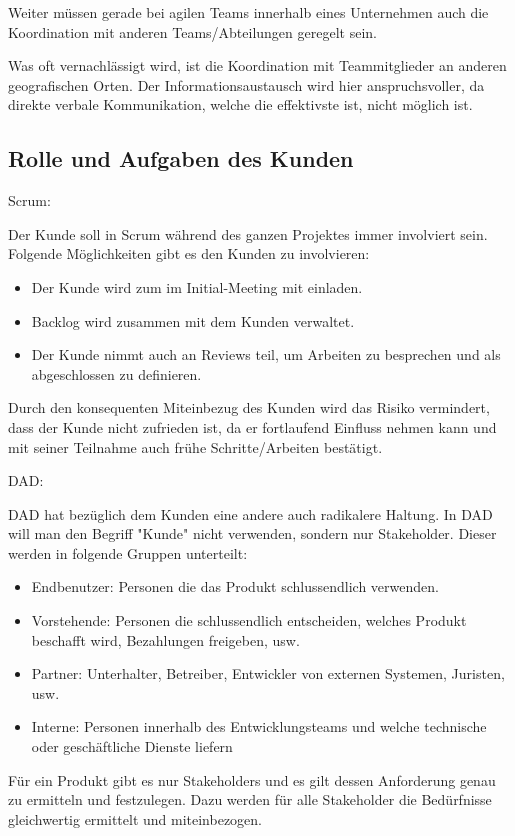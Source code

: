 Weiter müssen gerade bei agilen Teams innerhalb eines Unternehmen auch die Koordination mit anderen Teams/Abteilungen geregelt sein.
\medskip

Was oft vernachlässigt wird, ist die Koordination mit Teammitglieder an anderen geografischen Orten. Der Informationsaustausch wird hier anspruchsvoller, da direkte verbale Kommunikation, welche die effektivste ist, nicht möglich ist.


\subsection{Rolle und Aufgaben des Kunden}

{\Large Scrum:} \cite{planningPrioScrum} \medskip

Der Kunde soll in Scrum während des ganzen Projektes immer involviert sein. Folgende Möglichkeiten gibt es den Kunden zu involvieren:
\begin{itemize}
	\item Der Kunde wird zum im Initial-Meeting mit einladen.
	\item Backlog wird zusammen mit dem Kunden verwaltet.
	\item Der Kunde nimmt auch an Reviews teil, um Arbeiten zu besprechen und als abgeschlossen zu definieren.
\end{itemize}
Durch den konsequenten Miteinbezug des Kunden wird das Risiko vermindert, dass der Kunde nicht zufrieden ist, da er fortlaufend Einfluss nehmen kann und mit seiner Teilnahme auch frühe Schritte/Arbeiten bestätigt.
\bigskip 

{\Large DAD:} \cite{planningPrioDad} \medskip

DAD hat bezüglich dem Kunden eine andere auch radikalere Haltung. In DAD will man den Begriff "Kunde" nicht verwenden, sondern nur Stakeholder. Dieser werden in folgende Gruppen unterteilt:
\begin{itemize}
	\item Endbenutzer: Personen die das Produkt schlussendlich verwenden.
	\item Vorstehende: Personen die schlussendlich entscheiden, welches Produkt beschafft wird, Bezahlungen freigeben, usw.
	\item Partner: Unterhalter, Betreiber, Entwickler von externen Systemen, Juristen, usw.
	\item Interne: Personen innerhalb des Entwicklungsteams und welche technische oder geschäftliche Dienste liefern
\end{itemize}
Für ein Produkt gibt es nur Stakeholders und es gilt dessen Anforderung genau zu ermitteln und festzulegen. Dazu werden für alle Stakeholder die Bedürfnisse gleichwertig ermittelt und miteinbezogen. \smallskip


